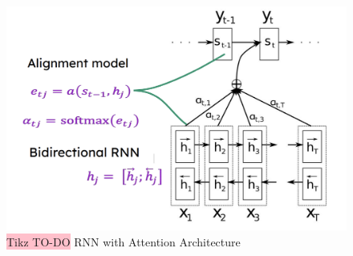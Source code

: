 \begin{figure}[!htbp]
    \centering
    \includegraphics[width=0.7\linewidth]{tikz/chapter7 - RNN with Attention.png}
    \caption{{\color{red}\colorbox{pink}{Tikz TO-DO}} RNN with Attention Architecture}
\end{figure}


